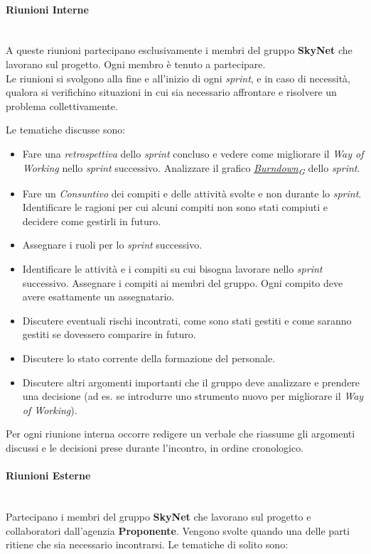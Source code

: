 \documentclass[12pt, a4paper]{article}
\newcommand{\urlglossario}{https://skynetunigroup.github.io/Code_Guardian/Documentazione/RTB/glossario_v1.0.0.pdf} %
\newcommand{\glo}[2]{\href{\urlglossario\#nameddest=#2}{#1\textsubscript{G}}}
\begin{document}
\paragraph{Riunioni Interne}\mbox{}\\
A queste riunioni partecipano esclusivamente i membri del gruppo \textbf{SkyNet} che lavorano sul progetto. Ogni membro è tenuto a partecipare.\\
Le riunioni si svolgono alla fine e all'inizio di ogni \textit{sprint}, e in caso di necessità, qualora si verifichino situazioni in cui sia necessario affrontare e risolvere un problema collettivamente.

Le tematiche discusse sono:

\begin{itemize}
\item
  Fare una \textit{retrospettiva} dello \textit{sprint} concluso e vedere come migliorare il \textit{Way of Working} nello \textit{sprint} successivo. Analizzare il grafico \textit{\glo{Burndown}{burndown-chart}} dello \textit{sprint}.
\item
  Fare un \textit{Consuntivo} dei compiti e delle attività svolte e non durante lo \textit{sprint}. Identificare le ragioni per cui alcuni compiti non sono stati compiuti e decidere come gestirli in futuro.
 \item
  Assegnare i ruoli per lo \textit{sprint} successivo.
\item
  Identificare le attività e i compiti su cui bisogna lavorare nello \textit{sprint} successivo. Assegnare i compiti ai membri del gruppo. Ogni compito deve avere esattamente un assegnatario.
 \item
  Discutere eventuali rischi incontrati, come sono stati gestiti e come saranno gestiti se dovessero comparire in futuro.
 \item
  Discutere lo stato corrente della formazione del personale.
 \item
  Discutere altri argomenti importanti che il gruppo deve analizzare e prendere una decisione (ad es. se introdurre uno strumento nuovo per migliorare il \textit{Way of Working}).
 \end{itemize}

Per ogni riunione interna occorre redigere un verbale che riassume gli argomenti discussi e le decisioni prese durante l'incontro, in ordine cronologico.

\paragraph{Riunioni Esterne}\mbox{}\\
Partecipano i membri del gruppo \textbf{SkyNet} che lavorano sul progetto e collaboratori dall'agenzia \textbf{Proponente}. Vengono svolte quando una delle parti ritiene che sia necessario incontrarsi. Le tematiche di solito sono:
\end{document}
